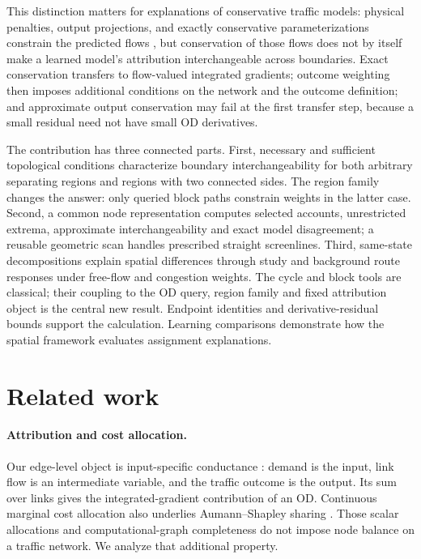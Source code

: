\documentclass[a4paper,fleqn]{cas-sc}
\begin{document}
This distinction matters for explanations of conservative traffic
models: physical penalties, output projections, and exactly
conservative parameterizations constrain the predicted flows
\citep{raissi2019physics,shi2021physics,valente2025physics,richterpowell2022neural},
but conservation of those flows does not by itself make a learned
model's attribution interchangeable across boundaries. Exact
conservation transfers to flow-valued integrated gradients; outcome
weighting then imposes additional conditions on the network and the
outcome definition; and approximate output conservation may fail at
the first transfer step, because a small residual need not have small
OD derivatives.

The contribution has three connected parts. First, necessary and sufficient
topological conditions characterize boundary interchangeability for both
arbitrary separating regions and regions with two connected sides. The
region family changes the answer: only queried block paths constrain weights
in the latter case. Second, a common node representation computes selected
accounts, unrestricted extrema, approximate interchangeability and exact
model disagreement; a reusable geometric scan handles prescribed straight
screenlines. Third, same-state decompositions explain spatial differences
through study and background route responses under free-flow and congestion
weights. The cycle and block tools are classical; their coupling to the OD
query, region family and fixed attribution object is the central new result.
Endpoint identities and derivative-residual bounds support the calculation.
Learning comparisons demonstrate how the spatial framework evaluates
assignment explanations.

\section{Related work}\label{sec:related}
\paragraph{Attribution and cost allocation.}
Our edge-level object is input-specific conductance
\citep{dhamdhere2019important,lundstrom2022rigorous}: demand is the input,
link flow is an intermediate variable, and the traffic outcome is the output.
Its sum over links gives the integrated-gradient contribution of an OD.
Continuous marginal cost allocation also underlies Aumann--Shapley sharing
\citep{aumann1974values,billera1978internal}. Those scalar allocations and
computational-graph completeness do not impose node balance on a traffic
network. We analyze that additional property.
\end{document}
